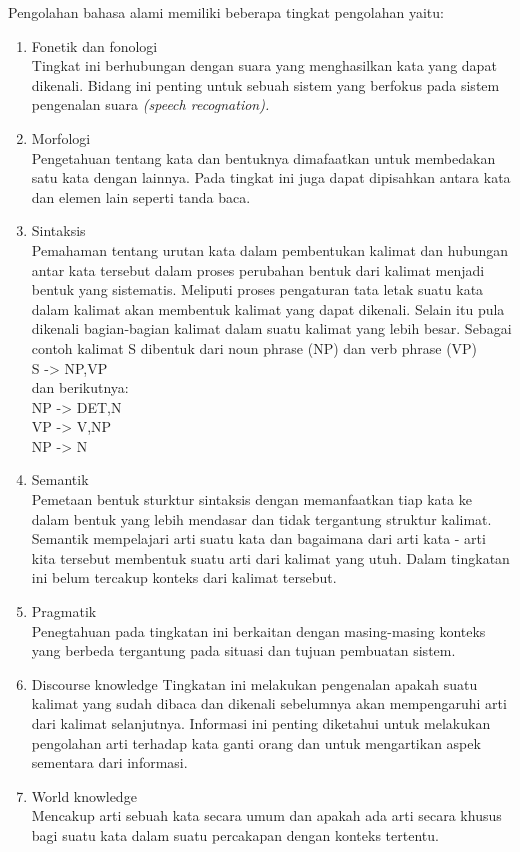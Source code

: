 Pengolahan bahasa alami memiliki beberapa tingkat pengolahan yaitu:
\begin{enumerate}
	\item Fonetik dan fonologi \\
		Tingkat ini berhubungan dengan suara yang menghasilkan kata yang dapat dikenali. Bidang ini penting untuk sebuah sistem yang berfokus pada sistem pengenalan suara \emph{(speech recognation).}
	\item Morfologi \\
		Pengetahuan tentang kata dan bentuknya dimafaatkan untuk membedakan satu kata dengan lainnya. Pada tingkat ini juga dapat dipisahkan antara kata dan elemen lain seperti tanda baca.
	\item Sintaksis \\
		Pemahaman tentang urutan kata dalam pembentukan kalimat dan hubungan antar kata tersebut dalam proses perubahan bentuk dari kalimat menjadi bentuk yang sistematis. Meliputi proses pengaturan tata letak suatu kata dalam kalimat akan membentuk kalimat yang dapat dikenali. Selain itu pula dikenali bagian-bagian kalimat dalam suatu kalimat yang lebih besar. Sebagai contoh kalimat S dibentuk dari noun phrase (NP) dan verb phrase (VP)\\
		S -> NP,VP\\
		dan berikutnya:\\
		NP -> DET,N\\
		VP -> V,NP\\
		NP -> N
	\item Semantik\\
		Pemetaan bentuk sturktur sintaksis dengan memanfaatkan tiap kata ke dalam bentuk yang lebih mendasar dan tidak tergantung struktur kalimat. Semantik mempelajari arti suatu kata dan bagaimana dari arti kata - arti kita tersebut membentuk suatu arti dari kalimat yang utuh. Dalam tingkatan ini belum tercakup konteks dari kalimat tersebut.
	\item Pragmatik\\
		Penegtahuan pada tingkatan ini berkaitan dengan masing-masing konteks yang berbeda tergantung pada situasi dan tujuan pembuatan sistem.
	\item Discourse knowledge
		Tingkatan ini melakukan pengenalan apakah suatu kalimat yang sudah dibaca dan dikenali sebelumnya akan mempengaruhi arti dari kalimat selanjutnya. Informasi ini penting diketahui untuk melakukan pengolahan arti terhadap kata ganti orang dan untuk mengartikan aspek sementara dari informasi.
	\item World knowledge\\
		Mencakup arti sebuah kata secara umum dan apakah ada arti secara khusus bagi suatu kata dalam suatu percakapan dengan konteks tertentu.
\end{enumerate}


